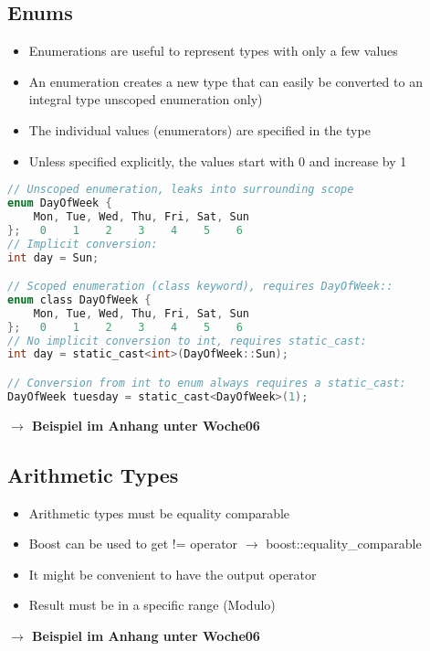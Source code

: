 \subsection{Enums}
\begin{itemize}
    \item Enumerations are useful to represent types with only a few values
    \item An enumeration creates a new type that can easily be converted to an integral type unscoped enumeration only)
    \item The individual values (enumerators) are specified in the type
    \item Unless specified explicitly, the values start with 0 and increase by 1
\end{itemize}

\begin{lstlisting}[style=frame, style= linenumbers, language=C]
// Unscoped enumeration, leaks into surrounding scope
enum DayOfWeek {
    Mon, Tue, Wed, Thu, Fri, Sat, Sun
};   0    1    2    3    4    5    6
// Implicit conversion:
int day = Sun;

// Scoped enumeration (class keyword), requires DayOfWeek::
enum class DayOfWeek {
    Mon, Tue, Wed, Thu, Fri, Sat, Sun
};   0    1    2    3    4    5    6
// No implicit conversion to int, requires static_cast:
int day = static_cast<int>(DayOfWeek::Sun);

// Conversion from int to enum always requires a static_cast:
DayOfWeek tuesday = static_cast<DayOfWeek>(1);
\end{lstlisting}
\vspace{0.3cm}
\textbf{$\rightarrow$ Beispiel im Anhang unter Woche06}

\subsection{Arithmetic Types}
\begin{itemize}
    \item Arithmetic types must be equality comparable
    \item Boost can be used to get != operator $\rightarrow$ boost::equality\_comparable
    \item It might be convenient to have the output operator
    \item Result must be in a specific range (Modulo)
\end{itemize}
\vspace{0.3cm}
\textbf{$\rightarrow$ Beispiel im Anhang unter Woche06}


